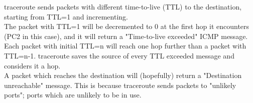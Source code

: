 traceroute sends packets with different time-to-live (TTL) to the destination, starting from TTL=1 and incrementing. \\
The packet with TTL=1 will be decremented to 0 at the first hop it encounters (PC2 in this case), and it will return a "Time-to-live exceeded" ICMP message. \\
Each packet with initial TTL=n will reach one hop further than a packet with TTL=n-1. traceroute saves the source of every TTL exceeded message and considers it a hop.\\
A packet which reaches the destination will (hopefully) return a "Destination unreachable" message. This is because traceroute sends packets to "unlikely ports"; ports which are unlikely to be in use.